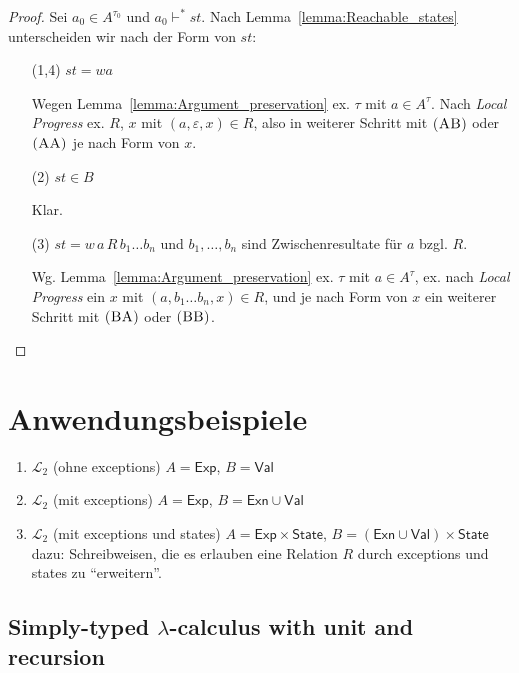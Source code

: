 \documentclass[12pt,a2paper,draft]{article}
\newcommand{\rn}[1]{\mbox{\ensuremath{\textsc{(#1)}}}}
\begin{document}
\begin{proof}
  Sei $a_0 \in A^{\tau_0}$ und $a_0 \vdash^* st$. Nach Lemma~\ref{lemma:Reachable_states} unterscheiden wir
  nach der Form von $st$:
  \begin{enumerate}
  \item[(1,4)] $st = wa$

    Wegen Lemma~\ref{lemma:Argument_preservation} ex. $\tau$ mit $a \in A^\tau$. Nach \emph{Local Progress}
    ex. $R$, $x$ mit $(a,\varepsilon,x) \in R$, also in weiterer Schritt mit \rn{AB} oder \rn{AA} je nach Form
    von $x$.

  \item[(2)] $st \in B$

    Klar.

  \item[(3)] $st = w\,a\,R\,b_1 \ldots b_n$ und $b_1,\ldots,b_n$ sind Zwischenresultate f\"ur $a$ bzgl.
    $R$.

    Wg. Lemma~\ref{lemma:Argument_preservation} ex. $\tau$ mit $a \in A^\tau$, ex. nach \emph{Local Progress}
    ein $x$ mit $(a,b_1 \ldots b_n,x) \in R$, und je nach Form von $x$ ein weiterer Schritt mit \rn{BA} oder \rn{BB}.
  \end{enumerate}
\end{proof}


\section{Anwendungsbeispiele}

\begin{enumerate}
\item $\mathcal{L}_2$ (ohne exceptions) $A = \textsf{Exp}$, $B = \textsf{Val}$
\item $\mathcal{L}_2$ (mit exceptions) $A = \textsf{Exp}$, $B = \textsf{Exn} \cup \textsf{Val}$
\item $\mathcal{L}_2$ (mit exceptions und states) $A = \textsf{Exp} \times \textsf{State}$,
  $B = (\textsf{Exn} \cup \textsf{Val}) \times \textsf{State}$ \\
  dazu: Schreibweisen, die es erlauben eine Relation $R$ durch exceptions und states
  zu ``erweitern''.
\end{enumerate}

\subsection{Simply-typed $\lambda$-calculus with unit and recursion}
\end{document}
